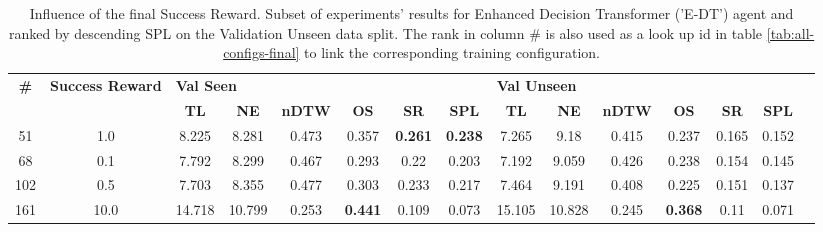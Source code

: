 \begin{table}
\centering
\caption{\label{tab:e_dt_reward_scale}Influence of the final Success Reward. Subset of experiments' results for Enhanced Decision Transformer ('E-DT') agent and ranked by descending SPL on the Validation Unseen data split. The rank in column \# is also used as a look up id in table \ref{tab:all-configs-final} to link the corresponding training configuration.}
\begin{tabular}{@{\hskip3pt}c@{\hskip3pt}c@{\hskip3pt}c@{\hskip3pt}c@{\hskip3pt}c@{\hskip3pt}c@{\hskip3pt}c@{\hskip3pt}c@{\hskip3pt}c@{\hskip3pt}c@{\hskip3pt}c@{\hskip3pt}c@{\hskip3pt}c@{\hskip3pt}c@{\hskip3pt}c}
\toprule
\textbf{\#} & \textbf{Success Reward } & \multicolumn{6}{l}{\textbf{Val Seen}} & \multicolumn{6}{l}{\textbf{Val Unseen}} \\
 \textbf{~} &               \textbf{~} &       \textbf{TL} & \textbf{NE} & \textbf{nDTW} &     \textbf{OS} &     \textbf{SR} &    \textbf{SPL} &         \textbf{TL} & \textbf{NE} & \textbf{nDTW} &     \textbf{OS} & \textbf{SR} & \textbf{SPL} \\
\midrule
         51 &                      1.0 &             8.225 &       8.281 &         0.473 &           0.357 &  \textbf{0.261} &  \textbf{0.238} &               7.265 &        9.18 &         0.415 &           0.237 &       0.165 &        0.152 \\
         68 &                      0.1 &             7.792 &       8.299 &         0.467 &           0.293 &            0.22 &           0.203 &               7.192 &       9.059 &         0.426 &           0.238 &       0.154 &        0.145 \\
        102 &                      0.5 &             7.703 &       8.355 &         0.477 &           0.303 &           0.233 &           0.217 &               7.464 &       9.191 &         0.408 &           0.225 &       0.151 &        0.137 \\
        161 &                     10.0 &            14.718 &      10.799 &         0.253 &  \textbf{0.441} &           0.109 &           0.073 &              15.105 &      10.828 &         0.245 &  \textbf{0.368} &        0.11 &        0.071 \\
\bottomrule
\end{tabular}
\end{table}
